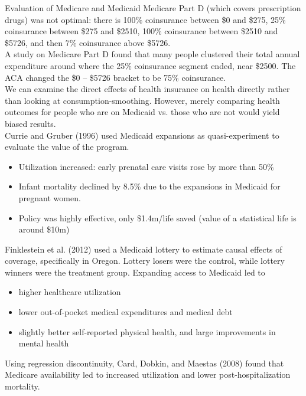 \documentclass[10pt]{extarticle}
\begin{document}
  \begin{problem}{Evaluation of Medicare and Medicaid}
    Medicare Part D (which covers prescription drugs) was not optimal: there is 100\% coinsurance between \$0 and \$275, 25\% coinsurance between \$275 and \$2510, 100\% coinsurance between \$2510 and \$5726, and then 7\% coinsurance above \$5726.\\

    A study on Medicare Part D found that many people clustered their total annual expenditure around where the 25\% coinsurance segment ended, near \$2500. The ACA changed the \$0 -- \$5726 bracket to be 75\% coinsurance.\\

    We can examine the direct effects of health insurance on health directly rather than looking at consumption-smoothing. However, merely comparing health outcomes for people who are on Medicaid vs. those who are not would yield biased results.\\

    Currie and Gruber (1996) used Medicaid expansions as quasi-experiment to evaluate the value of the program.
    \begin{itemize}
      \item Utilization increased: early prenatal care visits rose by more than 50\%
      \item Infant mortality declined by 8.5\% due to the expansions in Medicaid for pregnant women.
      \item Policy was highly effective, only \$1.4m/life saved (value of a statistical life is around \$10m)
    \end{itemize}
    Finklestein et al. (2012) used a Medicaid lottery to estimate causal effects of coverage, specifically in Oregon. Lottery losers were the control, while lottery winners were the treatment group. Expanding access to Medicaid led to
    \begin{itemize}
      \item higher healthcare utilization
      \item lower out-of-pocket medical expenditures and medical debt
      \item slightly better self-reported physical health, and large improvements in mental health
    \end{itemize}
    Using regression discontinuity, Card, Dobkin, and Maestas (2008) found that Medicare availability led to increased utilization and lower post-hospitalization mortality.
  \end{problem}
\end{document}
